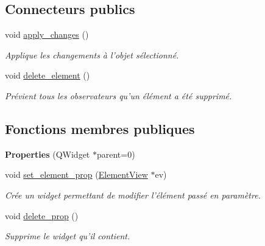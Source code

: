 \subsection*{Connecteurs publics}
\begin{DoxyCompactItemize}
\item 
\hypertarget{classProperties_aa8e9e5c83983a60486d963d2e5b97bf9}{void \hyperlink{classProperties_aa8e9e5c83983a60486d963d2e5b97bf9}{apply\+\_\+changes} ()}\label{classProperties_aa8e9e5c83983a60486d963d2e5b97bf9}

\begin{DoxyCompactList}\small\item\em Applique les changements à l’objet sélectionné. \end{DoxyCompactList}\item 
\hypertarget{classProperties_acb83b3e38f6bbe0cd57d0cf123460253}{void \hyperlink{classProperties_acb83b3e38f6bbe0cd57d0cf123460253}{delete\+\_\+element} ()}\label{classProperties_acb83b3e38f6bbe0cd57d0cf123460253}

\begin{DoxyCompactList}\small\item\em Prévient tous les observateurs qu’un élément a été supprimé. \end{DoxyCompactList}\end{DoxyCompactItemize}
\subsection*{Fonctions membres publiques}
\begin{DoxyCompactItemize}
\item 
\hypertarget{classProperties_a3b15688d359ed96e2632d2b642488a0e}{{\bfseries Properties} (Q\+Widget $\ast$parent=0)}\label{classProperties_a3b15688d359ed96e2632d2b642488a0e}

\item 
void \hyperlink{classProperties_a035f6ed307968ff3e06e53342c0b3843}{set\+\_\+element\+\_\+prop} (\hyperlink{classElementView}{Element\+View} $\ast$ev)
\begin{DoxyCompactList}\small\item\em Crée un widget permettant de modifier l’élément passé en paramètre. \end{DoxyCompactList}\item 
\hypertarget{classProperties_affc1d43c4a1894c71f7970b9fb58a9db}{void \hyperlink{classProperties_affc1d43c4a1894c71f7970b9fb58a9db}{delete\+\_\+prop} ()}\label{classProperties_affc1d43c4a1894c71f7970b9fb58a9db}

\begin{DoxyCompactList}\small\item\em Supprime le widget qu’il contient. \end{DoxyCompactList}\end{DoxyCompactItemize}
